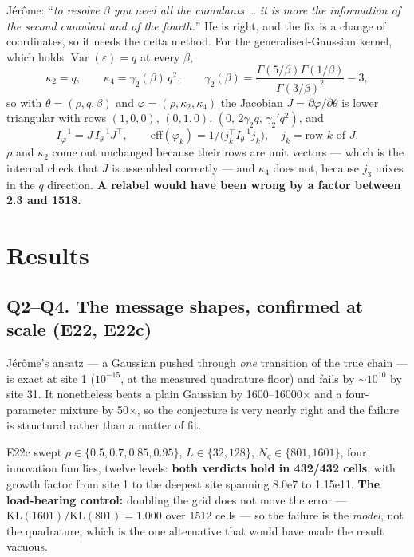 \documentclass[10pt,a4paper]{article}
\newcommand{\corr}{\rho}
\newcommand{\nsites}{L}
\newcommand{\st}[1]{\textbf{#1}}
\begin{document}
Jérôme: ``\emph{to resolve $\beta$ you need all the cumulants \dots{} it is more the information
of the second cumulant and of the fourth.}'' He is right, and the fix is a change of
coordinates, so it needs the delta method. For the generalised-Gaussian kernel, which holds
$\operatorname{Var}(\varepsilon)=q$ at every $\beta$,
\[
\kappa_2 = q, \qquad \kappa_4 = \gamma_2(\beta)\,q^2, \qquad
\gamma_2(\beta) = \frac{\Gamma(5/\beta)\Gamma(1/\beta)}{\Gamma(3/\beta)^2}-3 ,
\]
so with $\theta=(\corr,q,\beta)$ and $\varphi=(\corr,\kappa_2,\kappa_4)$ the Jacobian
$J=\partial\varphi/\partial\theta$ is lower triangular with rows $(1,0,0)$, $(0,1,0)$,
$(0,\,2\gamma_2 q,\,\gamma_2' q^2)$, and
\[
I_\varphi^{-1} = J\,I_\theta^{-1}J^{\!\top}, \qquad
\mathrm{eff}(\varphi_k) = 1/\bigl(j_k^{\!\top} I_\theta^{-1} j_k\bigr),\quad j_k = \text{row }k\text{ of }J .
\]
$\corr$ and $\kappa_2$ come out unchanged because their rows are unit vectors --- which is the
internal check that $J$ is assembled correctly --- and $\kappa_4$ does not, because $j_3$ mixes
in the $q$ direction. \st{A relabel would have been wrong by a factor between 2.3 and 1518.}

\section{Results}

\subsection{Q2--Q4. The message shapes, confirmed at scale (E22, E22c)}

Jérôme's ansatz --- a Gaussian pushed through \emph{one} transition of the true chain --- is
exact at site 1 ($10^{-15}$, at the measured quadrature floor) and fails by $\sim\!10^{10}$ by
site 31. It nonetheless beats a plain Gaussian by 1600--16000$\times$ and a four-parameter
mixture by 50$\times$, so the conjecture is very nearly right and the failure is structural
rather than a matter of fit.

E22c swept $\corr\in\{0.5,0.7,0.85,0.95\}$, $\nsites\in\{32,128\}$,
$N_g\in\{801,1601\}$, four innovation families, twelve levels: \st{both verdicts hold in 432/432
cells}, with growth factor from site 1 to the deepest site spanning 8.0e7 to 1.15e11.
\st{The load-bearing control:} doubling the grid does not move the error ---
$\mathrm{KL}(1601)/\mathrm{KL}(801) = 1.000$ over 1512 cells --- so the failure is the
\emph{model}, not the quadrature, which is the one alternative that would have made the result
vacuous.
\end{document}
